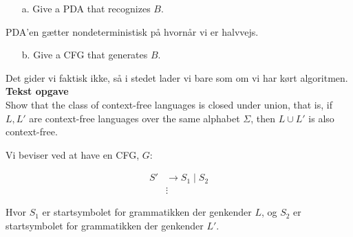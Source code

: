 \begin{enumerate}
  \item[a.] Give a PDA that recognizes $B$.
\end{enumerate}

PDA'en gætter nondeterministisk på hvornår vi er halvvejs.

\begin{enumerate}
  \item[b.] Give a CFG that generates $B$.
\end{enumerate}

Det gider vi faktisk ikke, så i stedet lader vi bare som om vi har kørt algoritmen.\\


\noindent
{\Large \textbf{Tekst opgave}}\\
\noindent
Show that the class of context-free languages is closed under union, that is, if $L, L'$ are context-free languages over the same alphabet $\Sigma$, then $L \cup L'$ is also context-free.

Vi beviser ved at have en CFG, $G$:

\begin{equation*}
\begin{split}
  S' &\rightarrow S_{1} \; | \; S_{2}\\
 &\vdots
\end{split}
\end{equation*}

Hvor $S_{1}$ er startsymbolet for grammatikken der genkender $L$, og $S_{2}$ er startsymbolet for grammatikken der genkender $L'$.\\


